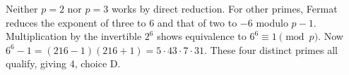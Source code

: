 Neither $p=2$ nor $p=3$ works by direct reduction. For other primes, Fermat reduces the exponent of three to 6 and that of two to $-6$ modulo $p-1$. Multiplication by the invertible $2^6$ shows equivalence to $6^6\equiv1\pmod p$. Now $6^6-1=(216-1)(216+1)=5\cdot43\cdot7\cdot31$. These four distinct primes all qualify, giving $\boxed{4}$, choice D.

